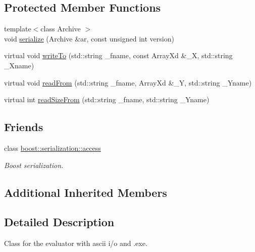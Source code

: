 \subsection*{Protected Member Functions}
\begin{DoxyCompactItemize}
\item 
{\footnotesize template$<$class Archive $>$ }\\void \hyperlink{class_go_s_u_m_1_1_c_exe_ascii_evaluator_a68297034ace4c45caa7a1dcd5ff022de}{serialize} (Archive \&ar, const unsigned int version)
\item 
virtual void \hyperlink{class_go_s_u_m_1_1_c_exe_ascii_evaluator_a4044398bdc3cae949e94786e37d0f477}{write\-To} (std\-::string \-\_\-fname, const Array\-Xd \&\-\_\-\-X, std\-::string \-\_\-\-Xname)
\item 
virtual void \hyperlink{class_go_s_u_m_1_1_c_exe_ascii_evaluator_a6bc1881693432b58ece64fa77eabd444}{read\-From} (std\-::string \-\_\-fname, Array\-Xd \&\-\_\-\-Y, std\-::string \-\_\-\-Yname)
\item 
virtual int \hyperlink{class_go_s_u_m_1_1_c_exe_ascii_evaluator_a5447eaef9e5a45f711de007b71fa4e0c}{read\-Size\-From} (std\-::string \-\_\-fname, std\-::string \-\_\-\-Yname)
\end{DoxyCompactItemize}
\subsection*{Friends}
\begin{DoxyCompactItemize}
\item 
class \hyperlink{class_go_s_u_m_1_1_c_exe_ascii_evaluator_ac98d07dd8f7b70e16ccb9a01abf56b9c}{boost\-::serialization\-::access}
\begin{DoxyCompactList}\small\item\em Boost serialization. \end{DoxyCompactList}\end{DoxyCompactItemize}
\subsection*{Additional Inherited Members}


\subsection{Detailed Description}
Class for the evaluator with ascii i/o and .exe. 

